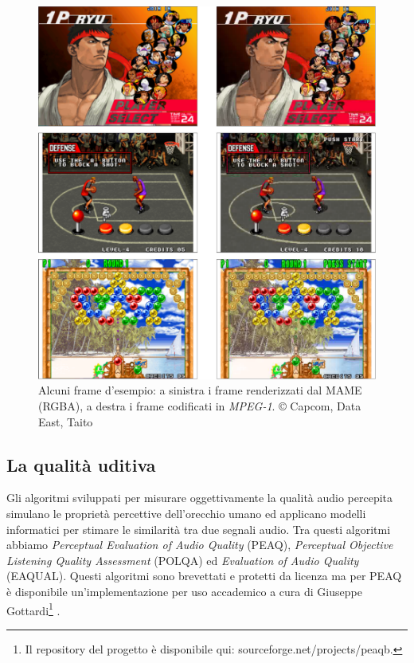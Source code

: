 \begin{figure}[H]
	\centering
	\includegraphics[width=\linewidth]{immagini/BMP_MPEG_compare}
	\caption{Alcuni frame d'esempio: a sinistra i frame renderizzati dal MAME (RGBA), a destra i frame codificati in \textit{MPEG-1}. © Capcom, Data East, Taito}
	\label{fig:BMP_MPEG_compare}
\end{figure}



\subsection{La qualità uditiva}
Gli algoritmi sviluppati per misurare oggettivamente la qualità audio percepita simulano le proprietà percettive dell'orecchio umano ed applicano modelli informatici per stimare le similarità tra due segnali audio. Tra questi algoritmi abbiamo \textit{Perceptual Evaluation of Audio Quality} (PEAQ), \textit{Perceptual Objective Listening Quality Assessment} (POLQA) ed \textit{Evaluation of Audio Quality} (EAQUAL). Questi algoritmi sono brevettati e protetti da licenza ma per PEAQ è disponibile un'implementazione per uso accademico a cura di Giuseppe Gottardi\footnote{Il repository del progetto è disponibile qui: sourceforge.net/projects/peaqb.} \parencite{PoctaPeter2015SaOA}.



